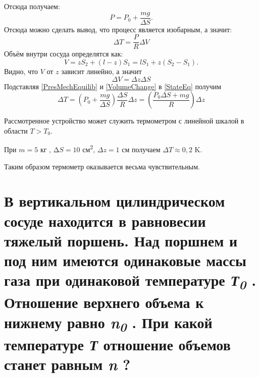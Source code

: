 Отсюда получаем:
\begin{equation} \label{PresMechEquilib}
  P = P_0 + \frac{mg}{\Delta S}.
\end{equation}
Отсюда можно сделать вывод, что процесс является изобарным, а значит:
\begin{equation} \label{StateEq}
  \Delta T = \frac{P}{R}\Delta V
\end{equation}
Объём внутри сосуда определятся как:
\begin{equation*} 
  V = zS_2 + (l - z)S_1 = lS_1 + z(S_2-S_1).
\end{equation*}
Видно, что $V$ от $z$ зависит линейно, а значит 
\begin{equation} \label{VolumeChange}
  \Delta V = \Delta z \Delta S
\end{equation}
Подставляя \ref{PresMechEquilib} и \ref{VolumeChange} в \ref{StateEq} получим 
\begin{equation}
  \Delta T = \left (P_0 + \frac{mg}{\Delta S}\right ) \frac{\Delta S}{R}\Delta z = \left (\frac{P_0 \Delta S + mg}{R}\right ) \Delta z
\end{equation}

Рассмотренное устройство может служить термометром с линейной шкалой в области $T > T_0$.

При $m = 5$ кг , $∆S = 10$ см\textsuperscript{2}, $\Delta z = 1$ см получаем $\Delta T \approx 0,2$ K.

Таким образом термометр оказывается весьма чувствительным.

\section{В вертикальном цилиндрическом сосуде находится в равновесии
тяжелый поршень. Над поршнем и под ним имеются одинаковые массы газа при
одинаковой температуре \emph{Т\textsubscript{0}} . Отношение верхнего
объема к нижнему равно \emph{n\textsubscript{0}} . При какой температуре
\emph{Т} отношение объемов станет равным \emph{n} ?}


